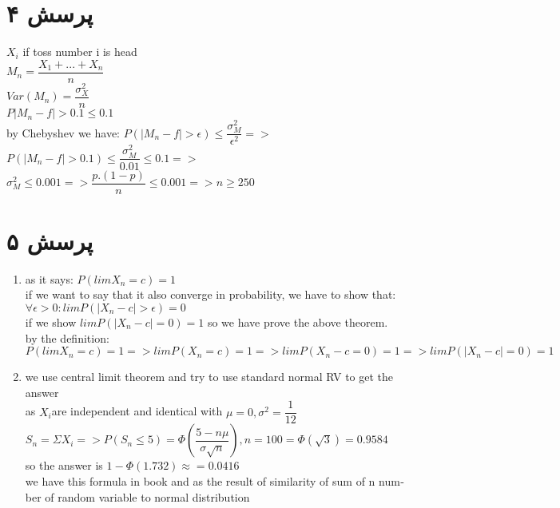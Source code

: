 \documentclass[a4paper]{article}
\begin{document}
\section*{پرسش ۴}
\begin{latin}
$X_i$ if toss number i is head\\
$M_n = \dfrac{X_1 + ... + X_n}{n}$\\
$Var(M_n) = \dfrac{\sigma_X^2}{n}$\\
$ P{|M_n - f|>0.1} \leq 0.1 $\\
by Chebyshev we have: $P(|M_n - f|> \epsilon) \leq \dfrac{\sigma_M^2}{\epsilon^2} =>$\\
$ P(|M_n - f|>0.1) \leq  \dfrac{\sigma_M^2}{0.01} \leq 0.1 =>$\\ 
$ \sigma_M^2 \leq 0.001 => \dfrac{p.(1-p)}{n} \leq 0.001 => n \geq 250$
\end{latin}
\pagebreak

\section*{پرسش ۵}
\begin{latin}
\begin{enumerate}
\item{}
as it says: $P(lim X_n = c)=1$\\
if we want to say that it also converge in probability, we have to show that: $\forall \epsilon > 0: lim P(|X_n - c|>\epsilon)=0$\\
if we show $lim P(|X_n - c|=0) = 1$ so we have prove the above theorem.\\
by the definition: $P(lim X_n = c) = 1 => lim P(X_n = c) = 1 => lim P(X_n - c = 0) = 1=> lim P(|X_n - c| = 0) = 1$\\

\item{}
we use central limit theorem and try to use standard normal RV to get the answer\\
as $X_i $are independent and identical with $\mu = 0, \sigma^2=\dfrac{1}{12}$\\
$S_n = \Sigma X_i => P(S_n \leq 5 )=\Phi(\dfrac{5-n\mu}{\sigma \sqrt{n}}), n =100= \Phi(\sqrt{3}) = 0.9584$\\
so the answer is $ 1-\Phi(1.732) \approx = 0.0416$\\
we have this formula in book and as the result of similarity of sum of n number of random variable to normal distribution\\
\end{enumerate}
\end{latin}
\end{document}
